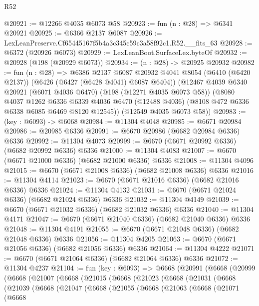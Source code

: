 \begin{lexlean}{R52}
\begin{coremodule}
@20921 := @12266 @4035 @6073 @58
@20923 := fun (n : @28) => @6341 @20921
@20925 := @6366 @2137 @6087
@20926 := LexLeanPreserve.Cf65445167f5b4a3c345c59c3a58f92c1.R52.__fits_63
@20928 := @6372 (@20926 @6073)
@20929 := LexLeanBoot.SurfaceLex.byteOf
@20932 := @20928 (@198 (@20929 @6073))
@20934 := (n : @28) -> @20925 @20932
@20982 := fun (n : @28) =>
  @6386
    @2137
    @6087
    @20932
    @4041
    @8054
    (@6410 (@6420 @2137))
    (@6426 (@6427 (@6428 @4041) @6087 @6404))
    (@12467
      @4039
      @6340
      @20921
      (@6071 @4036 @6470)
      (@198 (@12271 @4035 @6073 @58))
      (@8080
        @4037
        @1262
        @6336
        @6339
        @4036
        @6470
        (@12488 @4036)
        (@8108 @472 @6336 @6338 @6085 @6469 @8120 @12545))
      (@12549 @4035 @6073 @58))
@20983 := (key : @6093) -> @6068
@20984 := @11304 @4048
@20985 := @6671 @20984
@20986 := @20985 @6336
@20991 := @6670 @20986 (@6682 @20984 @6336) @6336
@20992 := @11304 @4073
@20999 := @6670 (@6671 @20992 @6336) (@6682 @20992 @6336) @6336
@21000 := @11304 @4083
@21007 := @6670 (@6671 @21000 @6336) (@6682 @21000 @6336) @6336
@21008 := @11304 @4096
@21015 := @6670 (@6671 @21008 @6336) (@6682 @21008 @6336) @6336
@21016 := @11304 @4114
@21023 := @6670 (@6671 @21016 @6336) (@6682 @21016 @6336) @6336
@21024 := @11304 @4132
@21031 := @6670 (@6671 @21024 @6336) (@6682 @21024 @6336) @6336
@21032 := @11304 @4149
@21039 := @6670 (@6671 @21032 @6336) (@6682 @21032 @6336) @6336
@21040 := @11304 @4171
@21047 := @6670 (@6671 @21040 @6336) (@6682 @21040 @6336) @6336
@21048 := @11304 @4191
@21055 := @6670 (@6671 @21048 @6336) (@6682 @21048 @6336) @6336
@21056 := @11304 @4205
@21063 := @6670 (@6671 @21056 @6336) (@6682 @21056 @6336) @6336
@21064 := @11304 @4222
@21071 := @6670 (@6671 @21064 @6336) (@6682 @21064 @6336) @6336
@21072 := @11304 @4237
@21104 := fun (key : @6093) =>
  @6668
    (@20991
      (@6668
        (@20999
          (@6668
            (@21007
              (@6668
                (@21015
                  (@6668
                    (@21023
                      (@6668
                        (@21031
                          (@6668
                            (@21039
                              (@6668
                                (@21047
                                  (@6668
                                    (@21055
                                      (@6668
                                        (@21063
                                          (@6668
                                            (@21071
                                              (@6668

\end{coremodule}
\end{lexlean}
